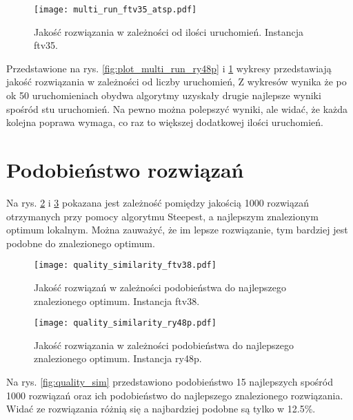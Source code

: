\documentclass{article}
\begin{document}
\begin{figure}[H]
    \begin{center}
        \texttt{[image: multi\_run\_ftv35\_atsp.pdf]}
    \end{center}
    \caption{Jakość rozwiązania w zależności od ilości uruchomień. Instancja ftv35.}
    \label{fig:plot_multi_run_ftv35}
\end{figure}

Przedstawione na rys. \ref{fig:plot_multi_run_ry48p} i \ref{fig:plot_multi_run_ftv35}  wykresy przedstawiają jakość rozwiązania w zależności od liczby uruchomień, Z wykresów wynika że po ok 50 uruchomieniach obydwa algorytmy uzyskały drugie najlepsze wyniki spośród stu uruchomień. Na pewno można polepszyć wyniki, ale widać, że każda kolejna poprawa wymaga, co raz to większej dodatkowej ilości uruchomień. 

\section{Podobieństwo rozwiązań}

Na rys. \ref{fig:quality_sim_ftv38} i \ref{fig:quality_sim_ry48p} pokazana jest zależność pomiędzy jakością 1000 rozwiązań otrzymanych przy pomocy algorytmu Steepest, a najlepszym znalezionym optimum lokalnym. Można zauważyć, że im lepsze rozwiązanie, tym bardziej jest podobne do znalezionego optimum.

\begin{figure}[H]
    \begin{center}
        \texttt{[image: quality\_similarity\_ftv38.pdf]}
    \end{center}
    \caption{Jakość rozwiązań w zależności podobieństwa do najlepszego znalezionego optimum. Instancja ftv38.}
    \label{fig:quality_sim_ftv38}
\end{figure}

\begin{figure}[H]
    \begin{center}
        \texttt{[image: quality\_similarity\_ry48p.pdf]}
    \end{center}
    \caption{Jakość rozwiązania w zależności podobieństwa do najlepszego znalezionego optimum. Instancja ry48p.}
    \label{fig:quality_sim_ry48p}
\end{figure}


Na rys. \ref{fig:quality_sim} przedstawiono podobieństwo 15 najlepszych spośród 1000 rozwiązań oraz ich podobieństwo do najlepszego znalezionego rozwiązania. Widać ze rozwiązania różnią się a najbardziej podobne są tylko w 12.5\%.
\end{document}
